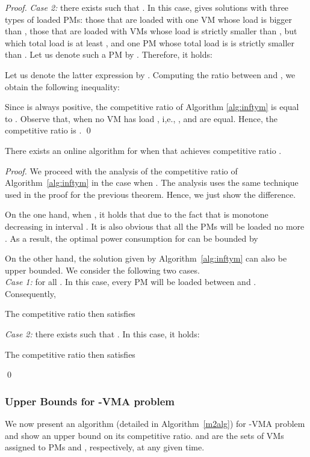 \begin{proof}
{}
\emph{Case 2:} there exists  such that .
In this case,  gives solutions with three types of loaded PMs:
those that are loaded with one VM whose load is bigger than ,
those that are loaded with VMs whose load is strictly smaller than , but which total load is at least ,
and one PM whose total load is is strictly smaller than .
Let us denote such a PM by .
Therefore, it holds:

Let us denote the latter expression by .
Computing the ratio  between  and , we obtain the following inequality:

Since  is always positive, the competitive ratio of Algorithm \ref{alg:inftym} is equal to .
Observe that, when no VM
 has load , i,e., ,
 and  are equal. Hence, the competitive ratio is .
\qed
\end{proof}


\begin{theorem}
There exists an online algorithm for  \CVMA when  that achieves competitive ratio .
\end{theorem}
\begin{proof}
We proceed with the analysis of the competitive ratio of Algorithm~\ref{alg:inftym} in the case when .
The analysis uses the same technique used in the proof for the previous theorem. Hence, we just show the difference.

On the one hand, when , it holds that  due to the fact that  is monotone decreasing in interval . It is also obvious that all the PMs will be loaded no more . As a result, the optimal power consumption for \CVMA can be bounded by


On the other hand, the solution given by Algorithm~\ref{alg:inftym} can also be upper bounded. 
We consider the following two cases. \\
\emph{Case 1:}  for all .
In this case, every PM will be loaded between  and . Consequently,

The competitive ratio  then satisfies

\emph{Case 2:}  there exists  such that . In this case, it holds: 

The competitive ratio  then satisfies

\qed
\end{proof}



\subsubsection{Upper Bounds for -VMA problem} We now present an algorithm (detailed in Algorithm~\ref{m2alg}) for -VMA problem and show an upper bound on its competitive ratio.
 and  are the sets of VMs
assigned to PMs  and , respectively, at any given time.


